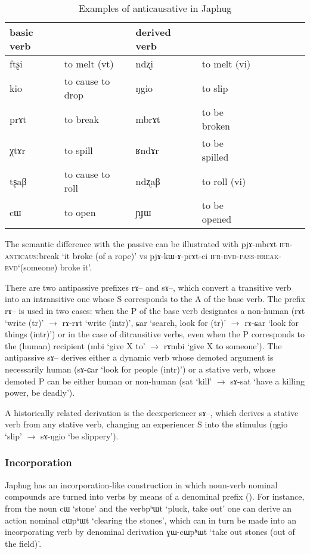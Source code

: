 \documentclass[oldfontcommands,oneside,a4paper,11pt]{article}
\newcommand{\ipa}[1]{{\phon#1}} %
\begin{document}
\begin{table}[H]
\caption{Examples of anticausative in Japhug}\label{tab:anticausative} \centering
\begin{tabular}{lllllllll} \toprule
basic verb  & &derived  verb &\\
\midrule
\ipa{ftʂi}  &	to melt (vt)	&		\ipa{ndʐi}  &	to melt (vi)		\\
\ipa{kio}  &	to cause to drop	&		\ipa{ŋgio}  &	to slip		\\
\ipa{prɤt}  &	to break	&		\ipa{mbrɤt}  &		to be broken	\\
\ipa{χtɤr}  &	 to spill	&		\ipa{ʁndɤr}  &		to be spilled	\\
\ipa{tʂaβ}  &	to cause to roll	&		\ipa{ndʐaβ}  &	to roll (vi)		\\
   \ipa{cɯ}  &	 to open 	&		\ipa{ɲɟɯ}  &	 to be opened	 	\\ 
 \bottomrule
\end{tabular}
\end{table}

The semantic difference with the passive can be illustrated with \ipa{pjɤ-mbrɤt} \textsc{ifr-anticaus}:break `it broke (of a rope)' vs \ipa{pjɤ-kɯ-ɤ-prɤt-ci} \textsc{ifr-evd-pass-break}-\textsc{evd}`(someone) broke it'.

There are two antipassive prefixes \ipa{rɤ--} and \ipa{sɤ--}, which convert a transitive verb into an intransitive one whose S corresponds to the A of the base verb. The prefix \ipa{rɤ--} is used in two cases: when the P of the base verb designates a non-human (\ipa{rɤt} `write (tr)' $\rightarrow$ \ipa{rɤ-rɤt} `write (intr)', \ipa{ɕar} `search, look for (tr)' $\rightarrow$ \ipa{rɤ-ɕar} `look for things (intr)') or in the case of ditransitive verbs, even when the P corresponds to the (human) recipient (\ipa{mbi} `give X to' $\rightarrow$ \ipa{rɤmbi} `give X to someone'). The antipassive \ipa{sɤ--} derives either a dynamic verb whose demoted argument is necessarily human (\ipa{sɤ-ɕar} `look for people (intr)') or a stative verb, whose demoted P can be either human or non-human (\ipa{sat} `kill' $\rightarrow$ \ipa{sɤ-sat} `have a killing power, be deadly'). 

A historically related derivation is the deexperiencer \ipa{sɤ--}, which derives a stative verb from any stative verb, changing an experiencer S into the stimulus (\ipa{ŋgio} `slip' $\rightarrow$ \ipa{sɤ-ŋgio} `be slippery').

\subsubsection{Incorporation}
Japhug has an incorporation-like construction in which noun-verb nominal compounds are turned into verbs by means of a denominal prefix (\citealt{jacques12incorp}). For instance, from the noun \ipa{cɯ} `stone' and the verb\ipa{pʰɯt} `pluck, take out' one can derive an action nominal    \ipa{cɯpʰɯt} `clearing the stones', which can in turn be made into an incorporating verb by denominal derivation  \ipa{ɣɯ-cɯpʰɯt } `take out stones (out of the field)'.
\end{document}
